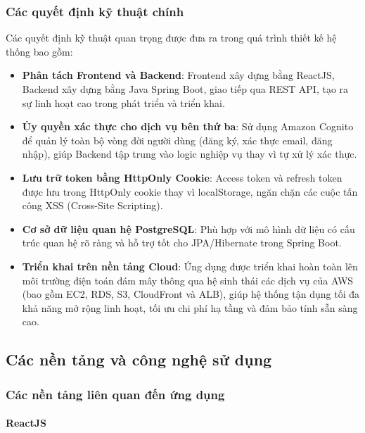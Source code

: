 \subsubsection{Các quyết định kỹ thuật chính}
Các quyết định kỹ thuật quan trọng được đưa ra trong quá trình thiết kế hệ thống bao gồm:
\begin{itemize}
    \item \textbf{Phân tách Frontend và Backend}: Frontend xây dựng bằng ReactJS, Backend xây dựng bằng Java Spring Boot, giao tiếp qua REST API, tạo ra sự linh hoạt cao trong phát triển và triển khai.
    \item \textbf{Ủy quyền xác thực cho dịch vụ bên thứ ba}: Sử dụng Amazon Cognito để quản lý toàn bộ vòng đời người dùng (đăng ký, xác thực email, đăng nhập), giúp Backend tập trung vào logic nghiệp vụ thay vì tự xử lý xác thực.
    \item \textbf{Lưu trữ token bằng HttpOnly Cookie}: Access token và refresh token được lưu trong HttpOnly cookie thay vì localStorage, ngăn chặn các cuộc tấn công XSS (Cross-Site Scripting).
    \item \textbf{Cơ sở dữ liệu quan hệ PostgreSQL}: Phù hợp với mô hình dữ liệu có cấu trúc quan hệ rõ ràng và hỗ trợ tốt cho JPA/Hibernate trong Spring Boot.
    \item \textbf{Triển khai trên nền tảng Cloud}: Ứng dụng được triển khai hoàn toàn lên môi trường điện toán đám mây thông qua hệ sinh thái các dịch vụ của AWS (bao gồm EC2, RDS, S3, CloudFront và ALB), giúp hệ thống tận dụng tối đa khả năng mở rộng linh hoạt, tối ưu chi phí hạ tầng và đảm bảo tính sẵn sàng cao.
\end{itemize}

\subsection{Các nền tảng và công nghệ sử dụng}

\subsubsection{Các nền tảng liên quan đến ứng dụng}

\paragraph{ReactJS}

